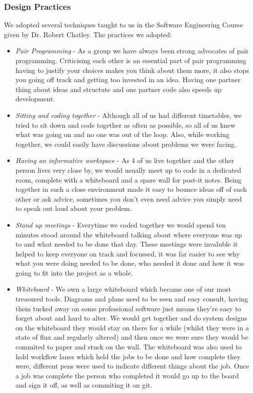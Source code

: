 \documentclass[11pt]{article}
\begin{document}
\subsubsection{Design Practices}
We adopted several techniques taught to us in the Software Engineering Course
given by Dr. Robert Chatley.
The practices we adopted:
\begin{itemize}
\item 
\emph{Pair Programming} - As a group we have always been strong advocates of pair
		 programming. Criticising each other is an essential part of pair programming
		 having to justify your choices makes you think about them more, it also 
		 stops you going off track and getting too invested in an idea. Having
		 one partner thing about ideas and structute and one partner code also speeds
		 up development.
\item 
\emph{Sitting and coding together} - Although all of us had different timetables,
			we tried to sit down and code together as often as possible, so all
			of us knew what was going on and no one was out of the loop. Also, while
			working together, we could easily have discussions about problems we
			were facing.
\item 
\emph{Having an informative workspace} - As 4 of us live together and the other
			person lives very close by, we would usually meet up to code in a 
			dedicated room, complete with a whiteboard and a spare wall for post-it
			notes. Being together in such a close environment made it easy to bounce
			ideas off of each other or ask advice, sometimes you don't even need advice
			you simply need to speak out loud about your problem.

\item 
\emph{Stand up meetings} - Everytime we coded together we would spend ten minutes
			stood around the whiteboard talking about where everyone was up to and what needed to
			be done that day. These meetings were invaluble it helped to keep everyone on track and
			focussed, it was far easier to see why what you were doing needed to be done, who needed it done 
			and how it was going to fit into the project as a whole.

\item
\emph{Whiteboard} - We own a large whiteboard which became one of our most treasured tools. Diagrams and plans 
					need to be seen and easy consult, having them tucked away on some professional software
					just means they're easy to forget about and hard to alter. We would get together and do
					system designs on the whiteboard they would stay on there for a while (whilst they were in a state of
					flux and regularly altered) and then once we were sure they would be commited to paper and stuck on the wall.
					The whiteboard was also used to hold workflow lanes which held the jobs to be done and how complete they were, 
					different pens were used to indicate different things about the job. Once a job was complete the person who
					completed it would go up to the board and sign it off, as well as commiting it on git.
					

\end{itemize}
\end{document}
